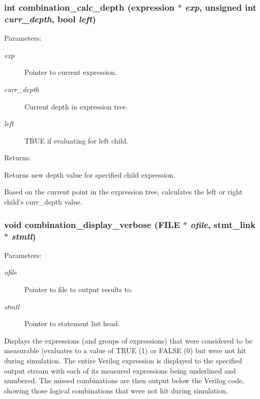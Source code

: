 \subsubsection{\setlength{\rightskip}{0pt plus 5cm}int combination\_\-calc\_\-depth ({\bf expression} $\ast$ {\em exp}, unsigned int {\em curr\_\-depth}, {\bf bool} {\em left})}\label{comb_8c_a5}


\begin{Desc}
\item[Parameters: ]\par
\begin{description}
\item[{\em 
exp}]Pointer to current expression. \item[{\em 
curr\_\-depth}]Current depth in expression tree. \item[{\em 
left}]TRUE if evaluating for left child.\end{description}
\end{Desc}
\begin{Desc}
\item[Returns: ]\par
Returns new depth value for specified child expression.\end{Desc}
Based on the current point in the expression tree, calculates the left or right child's curr\_\-depth value. 
\subsubsection{\setlength{\rightskip}{0pt plus 5cm}void combination\_\-display\_\-verbose (FILE $\ast$ {\em ofile}, {\bf stmt\_\-link} $\ast$ {\em stmtl})}\label{comb_8c_a17}


\begin{Desc}
\item[Parameters: ]\par
\begin{description}
\item[{\em 
ofile}]Pointer to file to output results to. \item[{\em 
stmtl}]Pointer to statement list head.\end{description}
\end{Desc}
Displays the expressions (and groups of expressions) that were considered  to be measurable (evaluates to a value of TRUE (1) or FALSE (0) but were  not hit during simulation. The entire Verilog expression is displayed to the specified output stream with each of its measured expressions being underlined and numbered. The missed combinations are then output below the Verilog code, showing those logical combinations that were not hit during simulation. 
